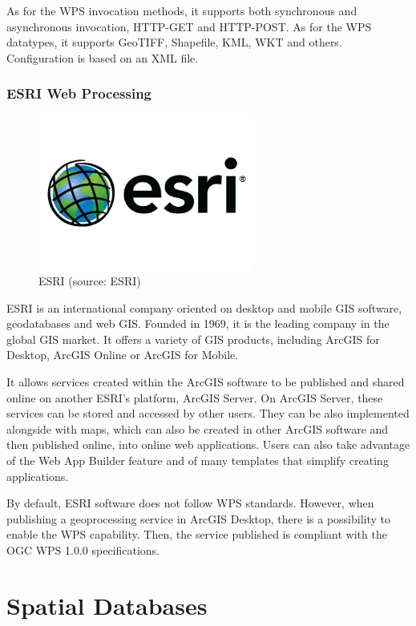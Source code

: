 As for the WPS invocation methods, it supports both synchronous and asynchronous invocation, HTTP-GET and HTTP-POST. As for the WPS datatypes, it supports GeoTIFF, Shapefile, KML, WKT and others.\cite{north} Configuration is based on an XML file.
  

\subsubsection{ESRI Web Processing}

\begin{figure}[H] \centering
      \includegraphics[width=200pt]{./pictures/esri.png}
      \caption[ESRI logo]{ESRI (source: ESRI)}
      \label{fig:ESRI}
  \end{figure}

ESRI is an international company oriented on desktop and mobile GIS software, geodatabases and web GIS. Founded in 1969, it is the leading company in the global GIS market. It offers a variety of GIS products, including ArcGIS for Desktop, ArcGIS Online or ArcGIS for Mobile. 

It allows services created within the ArcGIS software to be published and shared online on another ESRI's platform, ArcGIS Server. On ArcGIS Server, these services can be stored and accessed by other users. They can be also implemented alongside with maps, which can also be created in other ArcGIS software and then published online, into online web applications. Users can also take advantage of the Web App Builder feature and of many templates that simplify creating applications.

By default, ESRI software does not follow WPS standards. However, when publishing a geoprocessing service in ArcGIS Desktop, there is a possibility to enable the WPS capability. Then, the service published is compliant with the OGC WPS 1.0.0 specifications.\cite{arcgiswps}

\section{Spatial Databases}

